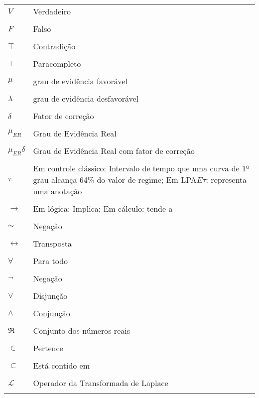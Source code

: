 \thispagestyle{empty}
\begin{longtable}[l]{p{50pt} p{300pt}}
  $V$ & Verdadeiro\\ \\
  $F$ & Falso\\ \\
  $\top$ & Contradição\\ \\
  $\bot$ & Paracompleto\\ \\
  $\mu $ & grau de evidência favorável \\ \\
  $\lambda $ & grau de evidência desfavorável \\ \\
  $\delta$ & Fator de correção \\ \\
  $\mu_{ER}$ & Grau de Evidência Real \\ \\
  $\mu_{ER}\delta$ & Grau de Evidência Real com fator de correção   \\ \\
  $\tau$ & Em controle clássico: Intervalo de tempo que uma curva de
  1º grau alcança 64\% do valor de regime; Em LPA$E\tau$: representa
  uma anotação\\ \\
  $\rightarrow$ & Em lógica: Implica; Em cálculo: tende a\\ \\
  $\sim$ & Negação\\ \\
  $\leftrightarrow$ & Transposta\\ \\
  $\forall$ & Para todo\\ \\
  $\neg$ & Negação\\ \\
  $\vee$ & Disjunção\\ \\
  $\wedge$ & Conjunção\\ \\
  $\Re$ & Conjunto dos números reais\\ \\
  $\in$ & Pertence\\ \\
  $\subset$ & Está contido em\\ \\
  $\mathscr{L} $ & Operador da Transformada de Laplace \\ \\

\end{longtable}
